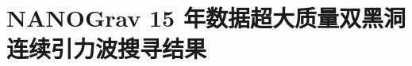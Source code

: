 \chapter{NANOGrav 15 年数据超大质量双黑洞连续引力波搜寻结果}
\label{chap:nanograv 15 year data search for continuous gravitational waves from supermassive black hole binaries}